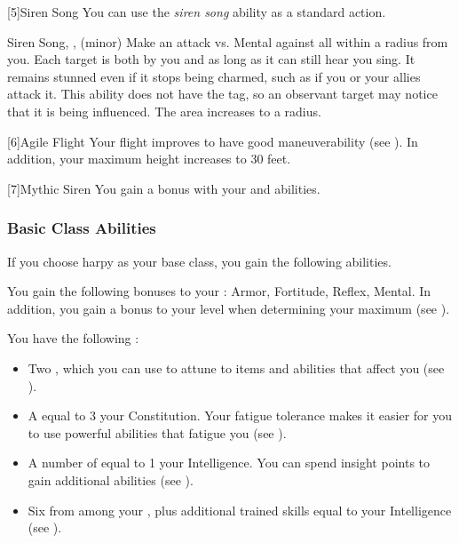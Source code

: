             [5]{Siren Song} You can use the \textit{siren song} ability as a standard action.
            \begin{magicalsustainability}{Siren Song}{, ,  (minor)}
                \rankline
                Make an attack vs. Mental against all  within a \medarea radius from you.
                \hit Each target is both \charmed by you and \stunned as long as it can still hear you sing.
                It remains stunned even if it stops being charmed, such as if you or your allies attack it.
                This ability does not have the  tag, so an observant target may notice that it is being influenced.
                \rankline
                 The area increases to a \largearea radius.
            \end{magicalsustainability}

            [6]{Agile Flight} Your flight improves to have good maneuverability (see ).
            In addition, your maximum height increases to 30 feet.

            [7]{Mythic Siren} You gain a   bonus with your  and  abilities.

        \subsubsection{Basic Class Abilities}
            If you choose harpy as your base class, you gain the following abilities.

            You gain the following bonuses to your :  Armor,  Fortitude,  Reflex,  Mental.
            In addition, you gain a  bonus to your level when determining your maximum  (see ).

             You have the following :
            \begin{itemize}
                \item Two , which you can use to attune to items and abilities that affect you (see ).
                \item A  equal to 3 \add your Constitution.
                    Your fatigue tolerance makes it easier for you to use powerful abilities that fatigue you (see ).
                \item A number of  equal to 1 \add your Intelligence.
                    You can spend insight points to gain additional abilities (see ).
                \item Six  from among your , plus additional trained skills equal to your Intelligence (see ).
            \end{itemize}

